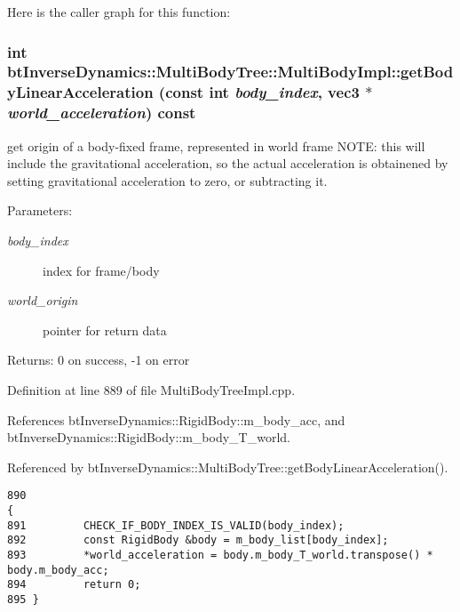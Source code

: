 Here is the caller graph for this function:\hypertarget{classbt_inverse_dynamics_1_1_multi_body_tree_1_1_multi_body_impl_86e8d45849ab884db42e9fc53fd155ca}{
\subsubsection[getBodyLinearAcceleration]{\setlength{\rightskip}{0pt plus 5cm}int btInverseDynamics::MultiBodyTree::MultiBodyImpl::getBodyLinearAcceleration (const int {\em body\_\-index}, \/  {\bf vec3} $\ast$ {\em world\_\-acceleration}) const}}
\label{classbt_inverse_dynamics_1_1_multi_body_tree_1_1_multi_body_impl_86e8d45849ab884db42e9fc53fd155ca}


get origin of a body-fixed frame, represented in world frame NOTE: this will include the gravitational acceleration, so the actual acceleration is obtainened by setting gravitational acceleration to zero, or subtracting it. \begin{Desc}
\item[Parameters:]
\begin{description}
\item[{\em body\_\-index}]index for frame/body \item[{\em world\_\-origin}]pointer for return data \end{description}
\end{Desc}
\begin{Desc}
\item[Returns:]0 on success, -1 on error \end{Desc}
 

Definition at line 889 of file MultiBodyTreeImpl.cpp.

References btInverseDynamics::RigidBody::m\_\-body\_\-acc, and btInverseDynamics::RigidBody::m\_\-body\_\-T\_\-world.

Referenced by btInverseDynamics::MultiBodyTree::getBodyLinearAcceleration().

\begin{Code}\begin{verbatim}890                                                                                                                                                         {
891         CHECK_IF_BODY_INDEX_IS_VALID(body_index);
892         const RigidBody &body = m_body_list[body_index];
893         *world_acceleration = body.m_body_T_world.transpose() * body.m_body_acc;
894         return 0;
895 }
\end{verbatim}
\end{Code}




